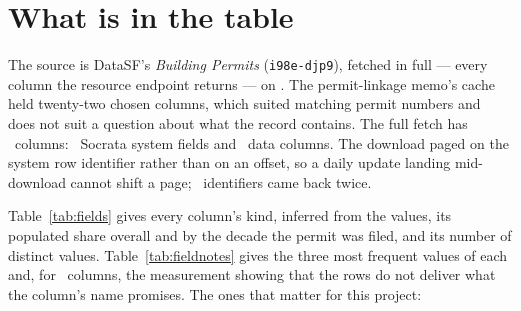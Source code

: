 \documentclass[11pt]{article}
\begin{document}
\tableofcontents
\newpage

\section{What is in the table}
\label{sec:fields}

The source is DataSF's \emph{Building Permits} (\texttt{i98e-djp9}), fetched in full --- every
column the resource endpoint returns --- on \pcRetrieved. The permit-linkage memo's cache
held twenty-two chosen columns, which suited matching permit numbers and does not suit a
question about what the record contains. The full fetch has \pcCols\ columns: \pcSystemCols\
Socrata system fields and \pcDataCols\ data columns. The download paged on the system row
identifier rather than on an offset, so a daily update landing mid-download cannot shift a
page; \pcDupIds\ identifiers came back twice.

Table~\ref{tab:fields} gives every column's kind, inferred from the values, its populated share
overall and by the decade the permit was filed, and its number of distinct values.
Table~\ref{tab:fieldnotes} gives the three most frequent values of each and, for \pcNoted\
columns, the measurement showing that the rows do not deliver what the column's name promises.
The ones that matter for this project:
\end{document}
